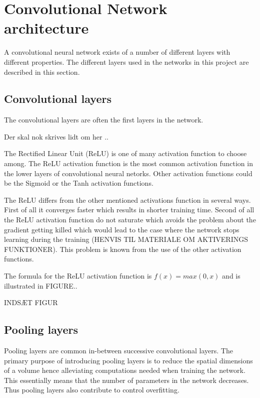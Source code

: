 \graphicspath{{Chapters/Project/}}

\section{Convolutional Network architecture} %
\label{sec:convolutional_network_architecture}

A convolutional neural network exists of a number of different layers with different properties. The different layers used in the networks in this project are described in this section. 

\subsection{Convolutional layers} %
\label{sub:conv_layers}

The convolutional layers are often the first layers in the network.

Der skal nok skrives lidt om her ..

The Rectified Linear Unit (ReLU) is one of many activation function to choose
among. The ReLU activation function is the most common activation function in the lower layers of convolutional neural netorks. Other activation functions could be the Sigmoid or the Tanh activation functions.

The ReLU differs from the other mentioned activations function in several ways. First of all it converges faster which results in shorter training time. Second of all the ReLU activation function do not saturate which avoids the problem about the gradient getting killed which would lead to the case where the network stops learning during the training (HENVIS TIL MATERIALE OM AKTIVERINGS FUNKTIONER). This problem is known from the use of the other activation functions. 

The formula for the ReLU activation function is $f(x)=max(0,x)$ and is illustrated in FIGURE..

INDSÆT FIGUR


\subsection{Pooling layers} %
\label{sub:pool_layers}

Pooling layers are common in-between successive convolutional layers. The primary purpose of introducing pooling layers is to reduce the spatial dimensions of a volume hence alleviating computations needed when training the network. This essentially means that the number of parameters in the network decreases. Thus pooling layers also contribute to control overfitting.

